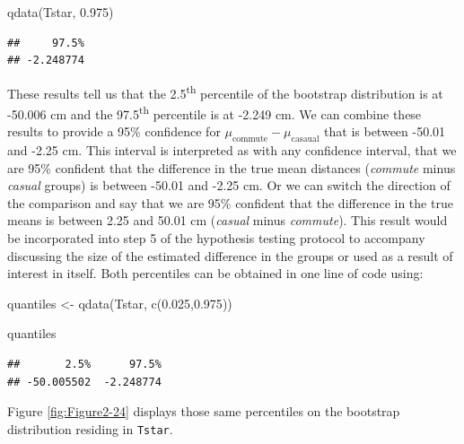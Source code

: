 \documentclass[
]{book}
\newenvironment{Shaded}{\begin{snugshade}}{\end{snugshade}}
\newcommand{\FloatTok}[1]{\textcolor[rgb]{0.00,0.00,0.81}{#1}}
\newcommand{\FunctionTok}[1]{\textcolor[rgb]{0.00,0.00,0.00}{#1}}
\newcommand{\NormalTok}[1]{#1}
\newcommand{\OtherTok}[1]{\textcolor[rgb]{0.56,0.35,0.01}{#1}}
\begin{document}
\begin{Shaded}
\begin{Highlighting}[]
\FunctionTok{qdata}\NormalTok{(Tstar, }\FloatTok{0.975}\NormalTok{)}
\end{Highlighting}
\end{Shaded}

\begin{verbatim}
##     97.5% 
## -2.248774
\end{verbatim}

These results tell us that the 2.5\textsuperscript{th} percentile of the bootstrap
distribution is at -50.006 cm and the 97.5\textsuperscript{th} percentile is at -2.249 cm. We can combine these results to provide a 95\% confidence for
\(\mu_\text{commute}-\mu_\text{casaual}\) that is between -50.01 and -2.25 cm. This interval is interpreted as with any confidence interval, that we are 95\% confident that the difference
in the true mean distances (\emph{commute} minus \emph{casual} groups) is
between -50.01 and -2.25 cm. Or we can switch the direction of the comparison and say that we are 95\% confident that the difference in the true means is between 2.25 and 50.01 cm (\emph{casual} minus \emph{commute}). This result would be incorporated into step 5 of the hypothesis testing protocol to accompany discussing the size of the estimated difference in the groups or used as a result of interest in itself. Both percentiles can be obtained in one line
of code using:

\begin{Shaded}
\begin{Highlighting}[]
\NormalTok{quantiles }\OtherTok{\textless{}{-}} \FunctionTok{qdata}\NormalTok{(Tstar, }\FunctionTok{c}\NormalTok{(}\FloatTok{0.025}\NormalTok{,}\FloatTok{0.975}\NormalTok{))}
\end{Highlighting}
\end{Shaded}

\begin{Shaded}
\begin{Highlighting}[]
\NormalTok{quantiles}
\end{Highlighting}
\end{Shaded}

\begin{verbatim}
##       2.5%      97.5% 
## -50.005502  -2.248774
\end{verbatim}

Figure \ref{fig:Figure2-24} displays those same percentiles on the bootstrap distribution residing in \texttt{Tstar}.
\end{document}
